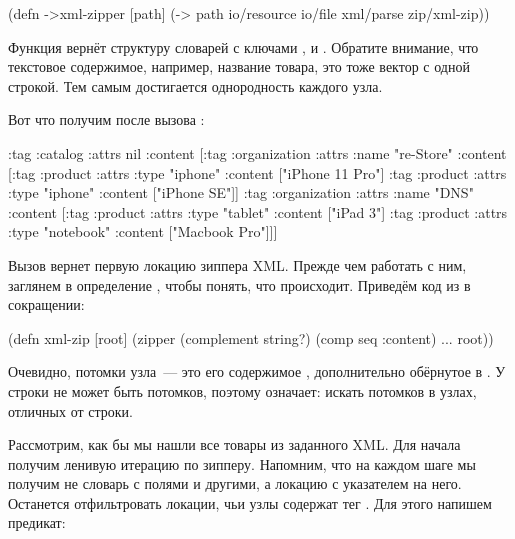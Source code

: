 \begin{english}
  \begin{clojure}
(defn ->xml-zipper [path]
  (-> path
      io/resource
      io/file
      xml/parse
      zip/xml-zip))
  \end{clojure}
\end{english}

Функция  вернёт структуру словарей с ключами ,  и
. Обратите внимание, что текстовое содержимое, например, название
товара, это тоже вектор с одной строкой. Тем самым достигается однородность
каждого узла.

Вот что получим после вызова :

\begin{english}
  \begin{clojure}
{:tag :catalog
 :attrs nil
 :content
 [{:tag :organization
   :attrs {:name "re-Store"}
   :content
   [{:tag :product
     :attrs {:type "iphone"}
     :content ["iPhone 11 Pro"]}
    {:tag :product :attrs {:type "iphone"} :content ["iPhone SE"]}]}
  {:tag :organization
   :attrs {:name "DNS"}
   :content
   [{:tag :product :attrs {:type "tablet"} :content ["iPad 3"]}
    {:tag :product
     :attrs {:type "notebook"}
     :content ["Macbook Pro"]}]}]}
  \end{clojure}
\end{english}

Вызов  вернет первую локацию зиппера XML. Прежде
чем работать с ним, заглянем в определение , чтобы понять, что
происходит. Приведём код из  в сокращении:

\begin{english}
  \begin{clojure}
(defn xml-zip
  [root]
  (zipper (complement string?)
          (comp seq :content)
          ...
          root))
  \end{clojure}
\end{english}

Очевидно, потомки узла~--- это его содержимое , дополнительно обёрнутое
в . У строки не может быть потомков, поэтому 
означает: искать потомков в узлах, отличных от строки.

Рассмотрим, как бы мы нашли все товары из заданного XML. Для начала получим
ленивую итерацию по зипперу. Напомним, что на каждом шаге мы получим не словарь
с полями  и другими, а локацию с указателем на него. Останется
отфильтровать локации, чьи узлы содержат тег . Для этого напишем
предикат:

